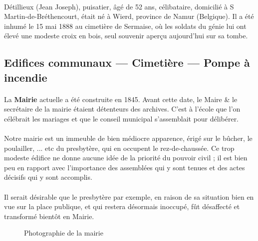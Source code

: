 \documentclass[../eBook.tex]{subfiles}
\begin{document}
      \paragraph{}Détillieux (Jean Joseph), puisatier, âgé de 52 ans, célibataire, domicilié à S Martin-de-Bréthencourt, était né à Wierd, province de Namur (Belgique). Il a été inhumé le 15 mai 1888 au cimetière de Sermaise, où les soldats du génie lui ont élevé une modeste croix en bois, seul souvenir aperçu aujourd'hui sur sa tombe.

  \subsection*{Edifices communaux --- Cimetière --- Pompe à incendie}
    \paragraph{}La \textbf{Mairie} actuelle a été construite en 1845. Avant cette date, le Maire \& le secrétaire de la mairie étaient détenteurs des archives. C'est à l'école que l'on célébrait les mariages et que le conseil municipal s'assemblait pour délibérer.
    \paragraph{}Notre mairie est un immeuble de bien médiocre apparence, érigé sur le bûcher, le poulailler, ... etc du presbytère, qui en occupent le rez-de-chaussée. Ce trop modeste édifice ne donne aucune idée de la priorité du pouvoir civil ; il est bien peu en rapport avec l'importance des assemblées qui y sont tenues et des actes décisifs qui y sont accomplis.
    \paragraph{}Il serait désirable que le presbytère par exemple, en raison de sa situation bien en vue sur la place publique, et qui restera désormais inoccupé, fût désaffecté et transformé bientôt en Mairie.
    \begin{center}
       \begin{figure}[!ht]
        \caption*{Photographie de la mairie}
      \end{figure}
     \end{center}
\end{document}
